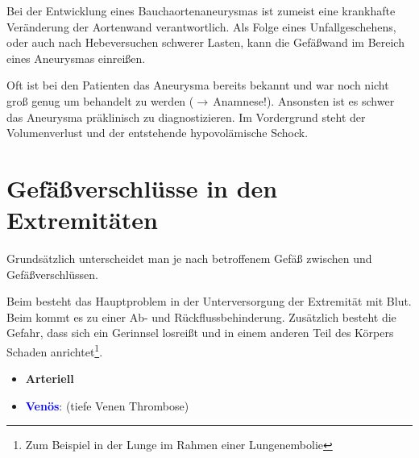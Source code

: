 {%
Bei der Entwicklung eines Bauchaortenaneurysmas ist zumeist
eine krankhafte Veränderung der Aortenwand
verantwortlich. Als Folge eines Unfallgeschehens,
oder auch nach Hebeversuchen schwerer Lasten, kann die
Gefäßwand im Bereich eines Aneurysmas einreißen. 
}
{\SymbolText}{}{}{}




Oft ist bei den Patienten das Aneurysma bereits bekannt und
war noch nicht groß genug um behandelt zu werden
(${\rightarrow}$\,Anamnese!). Ansonsten ist es schwer das
Aneurysma präklinisch zu diagnostizieren. Im Vordergrund
steht der Volumenverlust und der entstehende hypovolämische
Schock. 

\bigskip

\section{Gefäßverschlüsse in den Extremitäten}
\label{topic:gefaessverschluesse-extremitaeten}

{%
Grundsätzlich unterscheidet man je nach betroffenem Gefäß
zwischen  und 
Gefäßverschlüssen. 

Beim  besteht
das Hauptproblem in der Unterversorgung der Extremität mit
Blut. Beim  kommt es zu einer Ab- und
Rückflussbehinderung. Zusätzlich besteht die Gefahr, dass sich
ein Gerinnsel losreißt und in einem anderen Teil des
Körpers Schaden anrichtet\footnote{Zum Beispiel in der
Lunge im Rahmen einer Lungenembolie}.
}{
\begin{itemize}
  \item \textbf{\textcolor[rgb]{0.7882353,0.0,0.08627451}{Arteriell}}
  \item \textbf{\textcolor{blue}{Venös}}:
   (tiefe Venen Thrombose)
\end{itemize}
}{}{}{}



